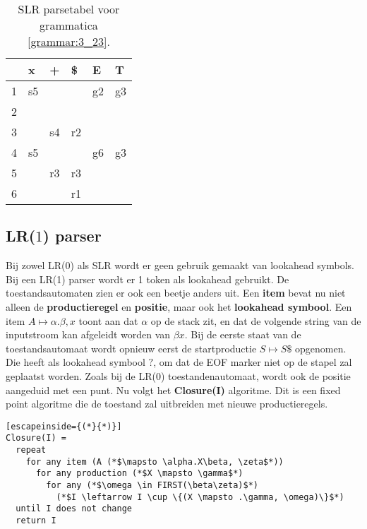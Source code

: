 \begin{table}[ht]
	\centering
	\begin{tabular}{l|lll|ll|}
		& x  & +  & \$ & E  & T  \\
		\hline
		1 & s5 &    &    & g2 & g3 \\
		2 &    &    &    &    &    \\
		3 &    & s4 & r2 &    &    \\
		4 & s5 &    &    & g6 & g3 \\
		5 &    & r3 & r3 &    &    \\
		6 &    &    & r1 &    &   \\
		\hline
	\end{tabular}
\caption{SLR parsetabel voor grammatica \ref{grammar:3_23}.}
\label{table:slr_parse_table_3_23}
\end{table}

\subsection{LR($1$) parser}
Bij zowel LR(0) als SLR wordt er geen gebruik gemaakt van lookahead symbols. Bij een LR(1) parser wordt er 1 token als lookahead gebruikt. De toestandsautomaten zien er ook een beetje anders uit. Een \textbf{item} bevat nu niet alleen de \textbf{productieregel} en \textbf{positie}, maar ook het \textbf{lookahead symbool}. Een item $A \mapsto \alpha.\beta, x$ toont aan dat $\alpha$ op de stack zit, en dat de volgende string van de inputstroom kan afgeleidt worden van $\beta x$. Bij de eerste staat van de toestandsautomaat wordt opnieuw eerst de startproductie $S \mapsto S\$$ opgenomen. Die heeft als lookahead symbool $?$, om dat de EOF marker niet op de stapel zal geplaatst worden. Zoals bij de LR(0) toestandenautomaat, wordt ook de positie aangeduid met een punt. Nu volgt het \textbf{Closure(I)} algoritme. Dit is een fixed point algoritme die de toestand zal uitbreiden met nieuwe productieregels.

\begin{lstlisting}[escapeinside={(*}{*)}]
Closure(I) =
  repeat
    for any item (A (*$\mapsto \alpha.X\beta, \zeta$*))
      for any production (*$X \mapsto \gamma$*)
        for any (*$\omega \in FIRST(\beta\zeta)$*)
          (*$I \leftarrow I \cup \{(X \mapsto .\gamma, \omega)\}$*)
  until I does not change
  return I
\end{lstlisting}

